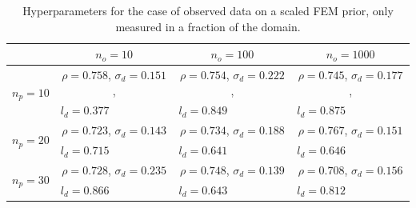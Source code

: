 \documentclass[%
  a4paper,oneside,%
  11pt,%
  smallchapters,
  style=printdev,
  extramargin,
  green,%
  rgb, <cmyk>
  ]{tubsbook}
\begin{document}
\begin{table}[!ht]
\centering
\caption{Hyperparameters for the case of observed data on a scaled FEM prior, only measured in a fraction of the domain. }
\label{tab:75procHalf}
\begin{tabular}{@{}lccc@{}}
\toprule
                            & $n_o = 10$                      & $n_o = 100$                     & $n_o = 1000$                     \\ \midrule
\multirow{2}{*}{$n_p = 10$} & $\rho=0.758$, $\sigma_d=0.151$, & $\rho=0.754$, $\sigma_d=0.222$, & $\rho=0.745$, $\sigma_d=0.177$, \\
                            & \multicolumn{1}{l}{$l_d=0.377$} & \multicolumn{1}{l}{$l_d=0.849$} & \multicolumn{1}{l}{$l_d=0.875$} \\
\multirow{2}{*}{$n_p = 20$} & $\rho=0.723$, $\sigma_d=0.143$  & $\rho=0.734$, $\sigma_d=0.188$  & $\rho=0.767$, $\sigma_d=0.151$  \\
                            & \multicolumn{1}{l}{$l_d=0.715$} & \multicolumn{1}{l}{$l_d=0.641$} & \multicolumn{1}{l}{$l_d=0.646$} \\
\multirow{2}{*}{$n_p = 30$} & $\rho=0.728$, $\sigma_d=0.235$  & $\rho=0.748$, $\sigma_d=0.139$  & $\rho=0.708$, $\sigma_d=0.156$  \\
                            & \multicolumn{1}{l}{$l_d=0.866$} & \multicolumn{1}{l}{$l_d=0.643$} & \multicolumn{1}{l}{$l_d=0.812$} \\ \bottomrule
\end{tabular}
\end{table}


\FloatBarrier
\end{document}
